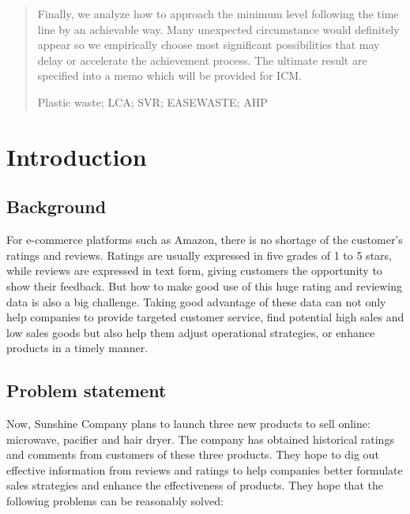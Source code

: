 \documentclass{mcmthesis}
\begin{document}
\begin{abstract}
Finally, we analyze how to approach the minimum level following the time line by an achievable way. Many unexpected circumstance would definitely appear so we empirically choose most significant possibilities that may delay or accelerate the achievement process. The ultimate result are specified into a memo which will be provided for ICM.

\begin{keywords}
Plastic waste; LCA; SVR; EASEWASTE; AHP
\end{keywords}
\end{abstract}
\maketitle
\thispagestyle{empty}
\tableofcontents
\thispagestyle{empty}
\newpage

\setcounter{page}{1}
\section{Introduction}
\subsection{Background}

For e-commerce platforms such as Amazon, there is no shortage of the customer's ratings and reviews. Ratings are usually expressed in five grades of 1 to 5 stars, while reviews are expressed in text form, giving customers the opportunity to show their feedback. But how to make good use of this huge rating and reviewing data is also a big challenge. Taking good advantage of these data can not only help companies to provide targeted customer service, find potential high sales and low sales goods but also help them adjust operational strategies, or enhance products in a timely manner\cite{zhang2006lord}.


\subsection{Problem statement}

Now, Sunshine Company plans to launch three new products to sell online: microwave, pacifier and hair dryer. The company has obtained historical ratings and comments from customers of these three products. They hope to dig out effective information from reviews and ratings to help companies better formulate sales strategies and enhance the effectiveness of products. They hope that the following problems can be reasonably solved:
\end{document}
